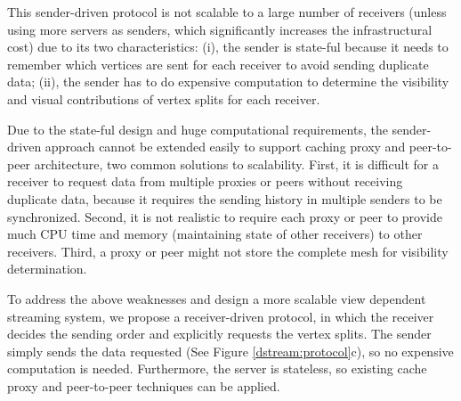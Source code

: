     This sender-driven protocol is not scalable to a large number 
    of receivers (unless using more servers as senders, 
    which significantly increases the infrastructural cost) 
    due to its two characteristics:
    (i), the sender is state-ful because it needs to remember which
    vertices are sent for each receiver to avoid sending duplicate data;
    (ii), the sender has to do expensive computation to determine the 
    visibility and visual contributions of vertex splits for each receiver.
    
    Due to the state-ful design and huge computational requirements,
    the sender-driven approach cannot be extended easily to support 
    caching proxy and peer-to-peer architecture, two common solutions to scalability. 
    First, it is difficult for a receiver to request data from multiple proxies or peers
    without receiving duplicate data, because it requires the sending history in multiple senders to  
    be synchronized. 
    Second, it is not realistic to require each proxy or peer to provide much CPU
    time and memory (maintaining state of other receivers) to other receivers. 
    Third, a proxy or peer might not store the complete mesh for visibility determination.

    To address the above weaknesses and design a more scalable view dependent streaming system, 
    we propose a receiver-driven protocol, 
    in which the receiver decides the sending order and explicitly requests
    the vertex splits. The sender simply sends the data requested 
    (See Figure \ref{dstream:protocol}c), so no expensive computation is needed.
    Furthermore, the server is stateless, so
    existing cache proxy and peer-to-peer techniques can be applied.

    \begin{comment}
    The receiver-driven protocol also reduces the size of data sent by the sender.
    In sender-driven protocols, for each vertex split, the sender has to send identifications
    to indicate which vertex to be split ($V_s$ in Figure \ref{f:intro:split2}),
    requiring at least $log_2{n}$ bits if $n$ vertices exist \cite{258843}. 
    In the receiver-driven protocol, however, the sender needs not send
    these identifications since the vertex splits can be sent according to
    the requesting order from the receiver. The identifications, sent
    by the receiver, consumes the down-link bandwidth 
    of the sender, which is often less likely to be the bottleneck than the up-link.
    \end{comment}

